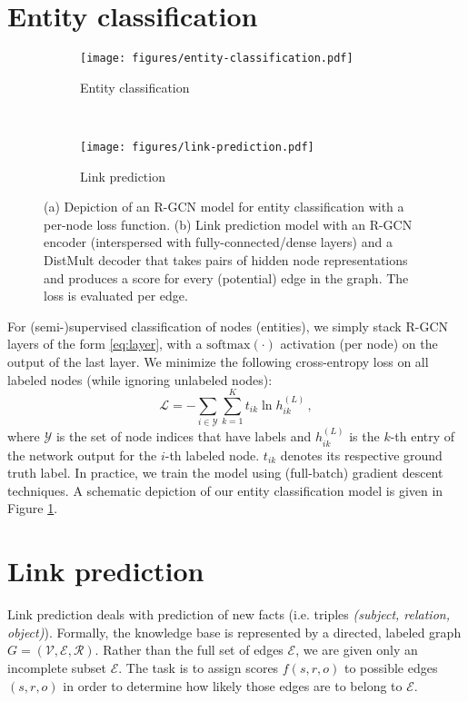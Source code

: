\section{Entity classification}
\begin{figure}[t!]
    \centering
    \begin{subfigure}[b]{0.4\linewidth}
      \centering
      \texttt{[image: figures/entity-classification.pdf]}
      \caption{Entity classification}        
      \label{fig:model-b}
    \end{subfigure}%
    ~\quad
    \begin{subfigure}[b]{0.49\linewidth}
        \centering
        \texttt{[image: figures/link-prediction.pdf]}
        \caption{Link prediction}
        \label{fig:model-c}
    \end{subfigure}
    \caption{(a) Depiction of an R-GCN model for entity classification with a per-node loss function. (b) Link prediction model with an R-GCN encoder (interspersed with fully-connected/dense layers) and a DistMult decoder that takes pairs of hidden node representations and produces a score for every (potential) edge in the graph. The loss is evaluated per edge.}
\end{figure}

For (semi-)supervised classification of nodes (entities), we simply stack R-GCN layers of the form \eqref{eq:layer}, with a $\mathrm{softmax}(\cdot)$ activation (per node) on the output of the last layer. We minimize the following cross-entropy loss on all labeled nodes (while ignoring unlabeled nodes):
\begin{equation}
\mathcal{L}= -\sum_{i\in\mathcal{Y}}\sum_{k=1}^K t_{ik} \ln h_{ik}^{(L)}  \, ,
\label{eq:}
\end{equation} 
where $\mathcal{Y}$ is the set of node indices that have labels and $h_{ik}^{(L)}$ is the $k$-th entry of the network output for the $i$-th labeled node. $t_{ik}$ denotes its respective ground truth label. In practice, we train the model using (full-batch) gradient descent techniques. A schematic depiction of our entity classification model is given in Figure \ref{fig:model-b}.
\section{Link prediction}\label{section:link_prediction}
Link prediction deals with prediction of new facts (i.e. triples \textit{(subject, relation, object)}). Formally, the knowledge base is represented by a directed, labeled graph $G = (\mathcal{V},\mathcal{E},\mathcal{R})$. Rather than the full set of edges $\mathcal{E}$, we are given only an incomplete subset $\hat{\mathcal{E}}$. The task is to assign scores $f(s,r,o)$ to possible edges $(s,r,o)$ in order to determine how likely those edges are to belong to $\mathcal{E}$.

